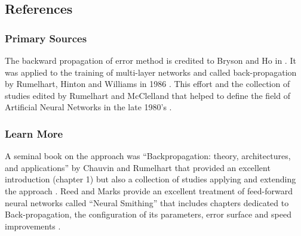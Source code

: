 

\subsection{References}

% 
% 
\subsubsection{Primary Sources}
The backward propagation of error method is credited to Bryson and Ho in \cite{Bryson1969}. It was applied to the training of multi-layer networks and called back-propagation by Rumelhart, Hinton and Williams in 1986 \cite{Rumelhart1986b, Rumelhart1986c}. 
This effort and the collection of studies edited by Rumelhart and McClelland that helped to define the field of Artificial Neural Networks in the late 1980's \cite{Rumelhart1986, Rumelhart1986a}.


% 
% 
\subsubsection{Learn More}
A seminal book on the approach was ``Backpropagation: theory, architectures, and applications'' by Chauvin and Rumelhart that provided an excellent introduction (chapter 1) but also a collection of studies applying and extending the approach \cite{Chauvin1995}.
Reed and Marks provide an excellent treatment of feed-forward neural networks called ``Neural Smithing'' that includes chapters dedicated to Back-propagation, the configuration of its parameters, error surface and speed improvements \cite{Reed1999}.


